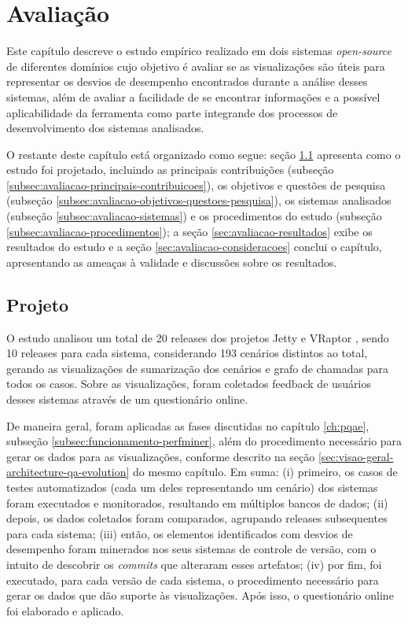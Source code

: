\chapter{Avaliação} \label{ch:avaliacao}

Este capítulo descreve o estudo empírico realizado em dois sistemas \textit{open-source} de diferentes domínios cujo objetivo é avaliar se as visualizações são úteis para representar os desvios de desempenho encontrados durante a análise desses sistemas, além de avaliar a facilidade de se encontrar informações e a possível aplicabilidade da ferramenta como parte integrande dos processos de desenvolvimento dos sistemas analisados.

O restante deste capítulo está organizado como segue: seção \ref{sec:avaliacao-projeto} apresenta como o estudo foi projetado, incluindo as principais contribuições (subseção \ref{subsec:avaliacao-principais-contribuicoes}), os objetivos e questões de pesquisa (subseção \ref{subsec:avaliacao-objetivos-questoes-pesquisa}), os sistemas analisados (subseção \ref{subsec:avaliacao-sistemas}) e os procedimentos do estudo (subseção \ref{subsec:avaliacao-procedimentos}); a seção \ref{sec:avaliacao-resultados} exibe os resultados do estudo e a seção \ref{sec:avaliacao-consideracoes} conclui o capítulo, apresentando as ameaças à validade e discussões sobre os resultados.

\section{Projeto} \label{sec:avaliacao-projeto}

O estudo analisou um total de 20 releases dos projetos Jetty \cite{Jetty2016} e VRaptor \cite{VRaptor2017}, sendo 10 releases para cada sistema, considerando 193 cenários distintos ao total, gerando as visualizações de sumarização dos cenários e grafo de chamadas para todos os casos. Sobre as visualizações, foram coletados feedback de usuários desses sistemas através de um questionário online.

De maneira geral, foram aplicadas as fases discutidas no capítulo \ref{ch:pqae}, subseção \ref{subsec:funcionamento-perfminer}, além do procedimento necessário para gerar os dados para as visualizações, conforme descrito na seção \ref{sec:visao-geral-architecture-qa-evolution} do mesmo capítulo. Em suma: (i) primeiro, os casos de testes automatizados (cada um deles representando um cenário) dos sistemas foram executados e monitorados, resultando em múltiplos bancos de dados; (ii) depois, os dados coletados foram comparados, agrupando releases subsequentes para cada sistema; (iii) então, os elementos identificados com desvios de desempenho foram minerados nos seus sistemas de controle de versão, com o intuito de descobrir os \textit{commits} que alteraram esses artefatos; (iv) por fim, foi executado, para cada versão de cada sistema, o procedimento necessário para gerar os dados que dão suporte às visualizações. Após isso, o questionário online foi elaborado e aplicado.

